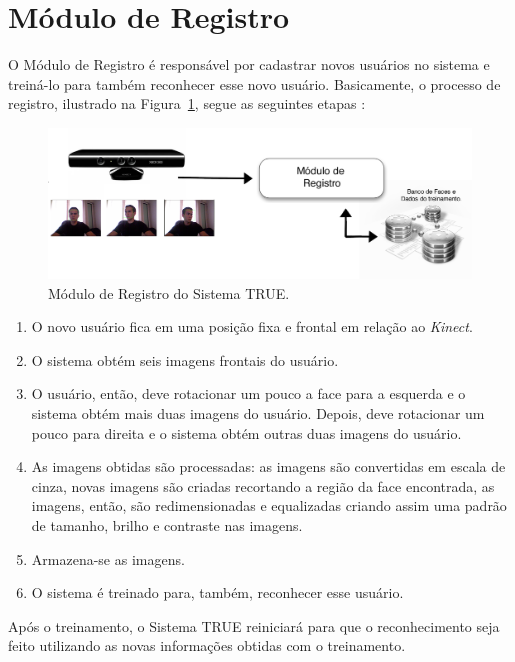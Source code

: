 \section{Módulo de Registro}

	O Módulo de Registro é responsável por cadastrar novos usuários no sistema e treiná-lo para também reconhecer esse novo usuário. Basicamente, o processo de registro, ilustrado na Figura~\ref{fig:registro}, segue as seguintes etapas :

		\begin{figure}[H]
			\begin{center}
				\includegraphics[scale=1.5]{figuras/4.ProblemaEProposta/registro.png}
			\end{center}
			\caption{Módulo de Registro do Sistema TRUE.}
			\label{fig:registro}
		\end{figure}		

		\begin{enumerate}
			\item O novo usuário fica em uma posição fixa e frontal em relação ao \textit{Kinect}. 
			\item O sistema obtém seis imagens frontais do usuário.
			\item O usuário, então, deve rotacionar um pouco a face para a esquerda e o sistema obtém mais duas imagens do usuário. Depois, deve rotacionar um pouco para direita e o sistema obtém outras duas imagens do usuário.
			\item As imagens obtidas são processadas: as imagens são convertidas em escala de cinza, novas imagens são criadas recortando a região da face encontrada, as imagens, então, são redimensionadas e equalizadas criando assim uma padrão de tamanho, brilho e contraste nas imagens.
			\item Armazena-se as imagens.
			\item O sistema é treinado para, também, reconhecer esse usuário.
		\end{enumerate}

	Após o treinamento, o Sistema TRUE reiniciará para que o reconhecimento seja feito utilizando as novas informações obtidas com o treinamento.

